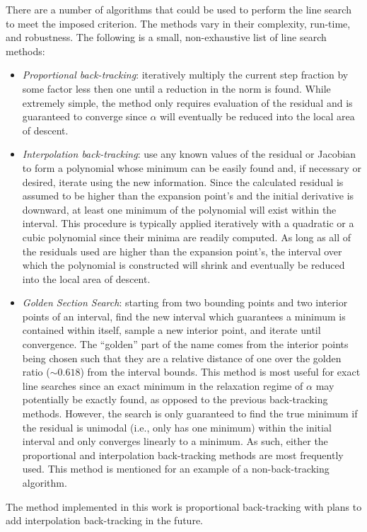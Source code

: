 \documentclass[12pt]{../UWMadThesis}
\begin{document}
There are a number of algorithms that could be used to perform the line search to meet the imposed criterion.
The methods vary in their complexity, run-time, and robustness.
The following is a small, non-exhaustive list of line search methods:
\begin{itemize}
	\item{\textit{Proportional back-tracking}: 
        iteratively multiply the current step fraction by some factor less then one until a reduction in the norm is found.
        While extremely simple, the method only requires evaluation of the residual and is guaranteed to converge since $\alpha$ will eventually be reduced into the local area of descent.
    }
    \item{\textit{Interpolation back-tracking}:
        use any known values of the residual or Jacobian to form a polynomial whose minimum can be easily found and, if necessary or desired, iterate using the new information.
        Since the calculated residual is assumed to be higher than the expansion point's and the initial derivative is downward, at least one minimum of the polynomial will exist within the interval.
        This procedure is typically applied iteratively with a quadratic or a cubic polynomial since their minima are readily computed.
        As long as all of the residuals used are higher than the expansion point's, the interval over which the polynomial is constructed will shrink and eventually be reduced into the local area of descent.
    }
    \item{\textit{Golden Section Search}:
        starting from two bounding points and two interior points of an interval, find the new interval which guarantees a minimum is contained within itself, sample a new interior point, and iterate until convergence.
        The ``golden'' part of the name comes from the interior points being chosen such that they are a relative distance of one over the golden ratio ($\sim0.618$) from the interval bounds.
        This method is most useful for exact line searches since an exact minimum in the relaxation regime of $\alpha$ may potentially be exactly found, as opposed to the previous back-tracking methods.
        However, the search is only guaranteed to find the true minimum if the residual is unimodal (i.e., only has one minimum) within the initial interval and only converges linearly to a minimum.
        As such, either the proportional and interpolation back-tracking methods are most frequently used.
        This method is mentioned for an example of a non-back-tracking algorithm.
    }
\end{itemize}
The method implemented in this work is proportional back-tracking with plans to add interpolation back-tracking in the future.
\end{document}
